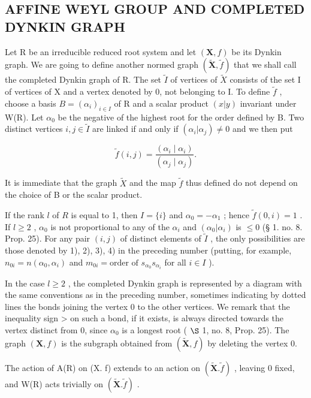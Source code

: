 \subsection{AFFINE WEYL GROUP AND COMPLETED DYNKIN GRAPH}

Let R be an irreducible reduced root system and let \((\mathbf{X}, f)\) be its Dynkin graph. We are going to define another normed graph \((\tilde{\mathbf{X}}, \tilde{f})\) that we shall call the completed Dynkin graph of R. The set \(\tilde{I}\) of vertices of \(\tilde{X}\) consists of the set I of vertices of X and a vertex denoted by 0, not belonging to I. To define \(\tilde{f}\) , choose a basis \(B = (\alpha_{i})_{i \in I}\) of R and a scalar product \((x|y)\) invariant under W(R). Let \(\alpha_{0}\) be the negative of the highest root for the order defined by B. Two distinct vertices \(i, j \in \tilde{I}\) are linked if and only if \((\alpha_{i}|\alpha_{j}) \neq 0\) and we then put

\[
\tilde {f} (i, j) = \frac {\left(\alpha_ {i} \mid \alpha_ {i}\right)}{\left(\alpha_ {j} \mid \alpha_ {j}\right)}.
\]

It is immediate that the graph \(\tilde{X}\) and the map \(\tilde{f}\) thus defined do not depend on the choice of B or the scalar product.

If the rank \(l\) of \(R\) is equal to 1, then \(I = \{i\}\) and \(\alpha_0 = -\alpha_1\) ; hence \(\tilde{f}(0, i) = 1\) . If \(l \geqslant 2\) , \(\alpha_0\) is not proportional to any of the \(\alpha_i\) and \((\alpha_0|\alpha_i)\) is \(\leqslant 0\) (§ 1. no. 8. Prop. 25). For any pair \((i,j)\) of distinct elements of \(\tilde{I}\) , the only possibilities are those denoted by 1), 2), 3), 4) in the preceding number (putting, for example, \(n_{0i} = n(\alpha_0, \alpha_i)\) and \(m_{0i} = \text{order of } s_{\alpha_0}s_{\alpha_i}\) for all \(i \in I\) ).

In the case \(l \geqslant 2\) , the completed Dynkin graph is represented by a diagram with the same conventions as in the preceding number, sometimes indicating by dotted lines the bonds joining the vertex 0 to the other vertices. We remark that the inequality sign \textgreater{} on such a bond, if it exists, is always directed towards the vertex distinct from 0, since \(\alpha_{0}\) is a longest root ( \(\S\) 1, no. 8, Prop. 25). The graph \((\mathbf{X}, f)\) is the subgraph obtained from \((\tilde{\mathbf{X}}, f)\) by deleting the vertex 0.

The action of A(R) on (X. f) extends to an action on \((\tilde{\mathbf{X}}.\tilde{f})\) , leaving 0 fixed, and W(R) acts trivially on \((\tilde{\mathbf{X}}.\tilde{f})\) .


